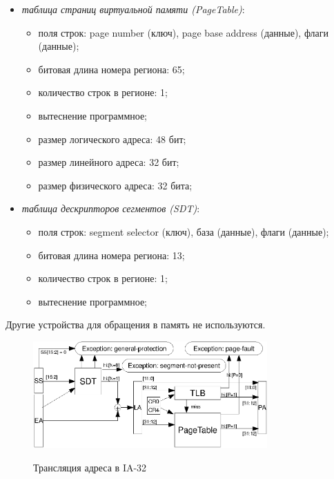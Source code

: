 \begin{itemize}
  \item \emph{таблица страниц виртуальной памяти (PageTable)}:
    \begin{itemize}
        \item поля строк: page number (ключ), page base address (данные), флаги
(данные);
        \item битовая длина номера региона: 65;
        \item количество строк в регионе: 1;
        \item вытеснение программное;
        \item размер логического адреса: 48 бит;
        \item размер линейного адреса: 32 бит;
        \item размер физического адреса: 32 бита;
    \end{itemize}


  \item \emph{таблица дескрипторов сегментов (SDT)}:
        \begin{itemize}
            \item поля строк: segment selector (ключ), база (данные), флаги
(данные);
            \item битовая длина номера региона: 13;
            \item количество строк в регионе: 1;
            \item вытеснение программное;
        \end{itemize}
\end{itemize}

Другие устройства для обращения в память не используются.

\begin{figure}[h] \center
  \includegraphics[width=0.8\textwidth]{4.analysis/ia32_addrtrans}\\
  \caption{Трансляция адреса в IA-32}\label{fig:ia32_address_translation}
\end{figure}


